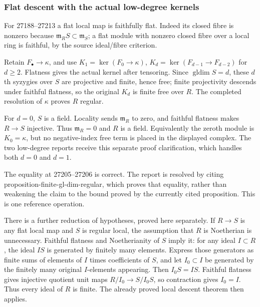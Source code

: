 \subsubsection{Flat descent with the actual low-degree kernels}\label{algebra-proof-023-flat-descent-with-the-actual-low-degree-kernels}

For 27188--27213 a flat local map is faithfully flat. Indeed its closed fibre is nonzero because \(\mathfrak m_RS\subset\mathfrak m_S\); a flat module with nonzero closed fibre over a local ring is faithful, by the source ideal/fibre criterion.

Retain \(F_\bullet\to\kappa\), and use \(K_1=\ker(F_0\to\kappa)\), \(K_d=\ker(F_{d-1}\to F_{d-2})\) for \(d\ge2\). Flatness gives the actual kernel after tensoring. Since \(\operatorname{gldim}S=d\), these \(d\)th syzygies over \(S\) are projective and finite, hence free; finite projectivity descends under faithful flatness, so the original \(K_d\) is finite free over \(R\). The completed resolution of \(\kappa\) proves \(R\) regular.

For \(d=0\), \(S\) is a field. Locality sends \(\mathfrak m_R\) to zero, and faithful flatness makes \(R\to S\) injective. Thus \(\mathfrak m_R=0\) and \(R\) is a field. Equivalently the zeroth module is \(K_0=\kappa\), but no negative-index free term is placed in the displayed complex. The two low-degree reports receive this separate proof clarification, which handles both \(d=0\) and \(d=1\).

The equality at 27205--27206 is correct. The report is resolved by citing proposition-finite-gl-dim-regular, which proves that equality, rather than weakening the claim to the bound proved by the currently cited proposition. This is one reference operation.

There is a further reduction of hypotheses, proved here separately. If \(R\to S\) is any flat local map and \(S\) is regular local, the assumption that \(R\) is Noetherian is unnecessary. Faithful flatness and Noetherianity of \(S\) imply it: for any ideal \(I\subset R\), the ideal \(IS\) is generated by finitely many elements. Express those generators as finite sums of elements of \(I\) times coefficients of \(S\), and let \(I_0\subset I\) be generated by the finitely many original \(I\)-elements appearing. Then \(I_0S=IS\). Faithful flatness gives injective quotient unit maps \(R/I_0\to S/I_0S\), so contraction gives \(I_0=I\). Thus every ideal of \(R\) is finite. The already proved local descent theorem then applies.

